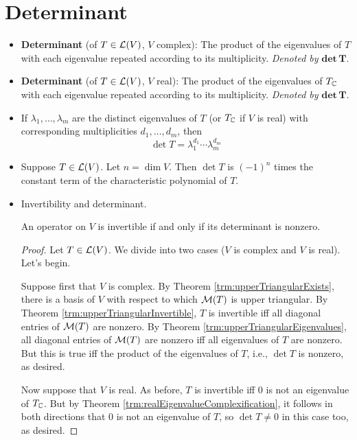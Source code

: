 \documentclass[../main.tex]{subfiles}
\begin{document}
\section{Determinant}
\begin{itemize}
    \item \textbf{Determinant} (of $T\in\mathcal{L}(V)$, $V$ complex): The product of the eigenvalues of $T$ with each eigenvalue repeated according to its multiplicity. \emph{Denoted by} $\mathbf{det}\,\bm{T}$.
    \item \textbf{Determinant} (of $T\in\mathcal{L}(V)$, $V$ real): The product of the eigenvalues of $T_{\mathbb{C}}$ with each eigenvalue repeated according to its multiplicity. \emph{Denoted by} $\mathbf{det}\,\bm{T}$.
    \item If $\lambda_1,\dots,\lambda_m$ are the distinct eigenvalues of $T$ (or $T_{\mathbb{C}}$ if $V$ is real) with corresponding multiplicities $d_1,\dots,d_m$, then
    \begin{equation*}
        \det T = \lambda_1^{d_1}\cdots\lambda_m^{d_m}
    \end{equation*}
    \item Suppose $T\in\mathcal{L}(V)$. Let $n=\dim V$. Then $\det T$ is $(-1)^n$ times the constant term of the characteristic polynomial of $T$.
    \item Invertibility and determinant.
    \begin{theorem}
        An operator on $V$ is invertible if and only if its determinant is nonzero.
        \begin{proof}
            Let $T\in\mathcal{L}(V)$. We divide into two cases ($V$ is complex and $V$ is real). Let's begin.\par
            Suppose first that $V$ is complex. By Theorem \ref{trm:upperTriangularExists}, there is a basis of $V$ with respect to which $\mathcal{M}(T)$ is upper triangular. By Theorem \ref{trm:upperTriangularInvertible}, $T$ is invertible iff all diagonal entries of $\mathcal{M}(T)$ are nonzero. By Theorem \ref{trm:upperTriangularEigenvalues}, all diagonal entries of $\mathcal{M}(T)$ are nonzero iff all eigenvalues of $T$ are nonzero. But this is true iff the product of the eigenvalues of $T$, i.e., $\det T$ is nonzero, as desired.\par
            Now suppose that $V$ is real. As before, $T$ is invertible iff 0 is not an eigenvalue of $T_{\mathbb{C}}$. But by Theorem \ref{trm:realEigenvalueComplexification}, it follows in both directions that 0 is not an eigenvalue of $T$, so $\det T\neq 0$ in this case too, as desired.
        \end{proof}

\end{theorem}
\end{itemize}
\end{document}

